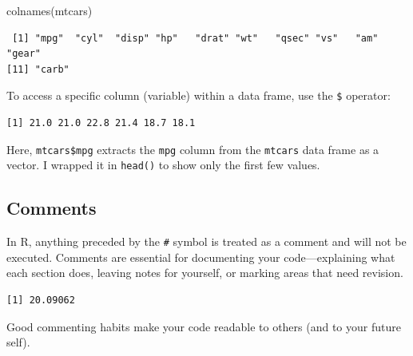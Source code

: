 \documentclass[
  letterpaper,
  DIV=11,
  numbers=noendperiod]{scrreprt}
\newenvironment{Shaded}{\begin{snugshade}}{\end{snugshade}}
\newcommand{\CommentTok}[1]{\textcolor[rgb]{0.37,0.37,0.37}{#1}}
\newcommand{\FunctionTok}[1]{\textcolor[rgb]{0.28,0.35,0.67}{#1}}
\newcommand{\NormalTok}[1]{\textcolor[rgb]{0.00,0.23,0.31}{#1}}
\newcommand{\SpecialCharTok}[1]{\textcolor[rgb]{0.37,0.37,0.37}{#1}}
\begin{document}
\begin{Shaded}
\begin{Highlighting}[]
\FunctionTok{colnames}\NormalTok{(mtcars)}
\end{Highlighting}
\end{Shaded}

\begin{verbatim}
 [1] "mpg"  "cyl"  "disp" "hp"   "drat" "wt"   "qsec" "vs"   "am"   "gear"
[11] "carb"
\end{verbatim}

To access a specific column (variable) within a data frame, use the
\texttt{\$} operator:

\begin{Shaded}
\end{Shaded}

\begin{verbatim}
[1] 21.0 21.0 22.8 21.4 18.7 18.1
\end{verbatim}

Here, \texttt{mtcars\$mpg} extracts the \texttt{mpg} column from the
\texttt{mtcars} data frame as a vector. I wrapped it in \texttt{head()}
to show only the first few values.

\subsection{Comments}\label{comments}

In R, anything preceded by the \texttt{\#} symbol is treated as a
comment and will not be executed. Comments are essential for documenting
your code---explaining what each section does, leaving notes for
yourself, or marking areas that need revision.

\begin{Shaded}
\end{Shaded}

\begin{verbatim}
[1] 20.09062
\end{verbatim}

Good commenting habits make your code readable to others (and to your
future self).
\end{document}

